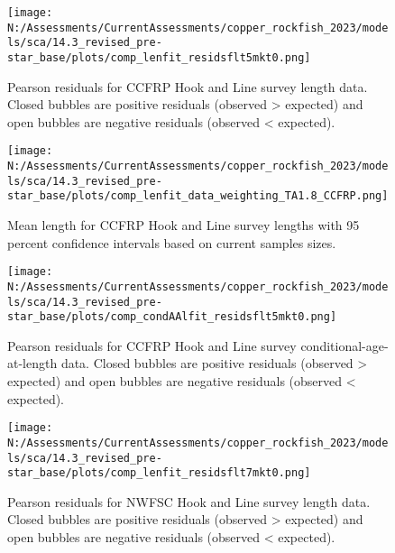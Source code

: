 \documentclass[11pt,
  english,
  letterpaper,
]{article}
\begin{document}
\pagebreak

\begin{figure}
\centering
\texttt{[image: N:/Assessments/CurrentAssessments/copper\_rockfish\_2023/models/sca/14.3\_revised\_pre-star\_base/plots/comp\_lenfit\_residsflt5mkt0.png]}
\caption{Pearson residuals for CCFRP Hook and Line survey length data. Closed bubbles are positive residuals (observed \textgreater{} expected) and open bubbles are negative residuals (observed \textless{} expected).\label{fig:ccfrp-len-pearson}}
\end{figure}

\pagebreak

\begin{figure}
\centering
\texttt{[image: N:/Assessments/CurrentAssessments/copper\_rockfish\_2023/models/sca/14.3\_revised\_pre-star\_base/plots/comp\_lenfit\_data\_weighting\_TA1.8\_CCFRP.png]}
\caption{Mean length for CCFRP Hook and Line survey lengths with 95 percent confidence intervals based on current samples sizes.\label{fig:ccfrp-mean-len-fit}}
\end{figure}

\pagebreak

\begin{figure}
\centering
\texttt{[image: N:/Assessments/CurrentAssessments/copper\_rockfish\_2023/models/sca/14.3\_revised\_pre-star\_base/plots/comp\_condAAlfit\_residsflt5mkt0.png]}
\caption{Pearson residuals for CCFRP Hook and Line survey conditional-age-at-length data. Closed bubbles are positive residuals (observed \textgreater{} expected) and open bubbles are negative residuals (observed \textless{} expected).\label{fig:ccfrp-age-pearson}}
\end{figure}

\pagebreak

\pagebreak

\pagebreak

\begin{figure}
\centering
\texttt{[image: N:/Assessments/CurrentAssessments/copper\_rockfish\_2023/models/sca/14.3\_revised\_pre-star\_base/plots/comp\_lenfit\_residsflt7mkt0.png]}
\caption{Pearson residuals for NWFSC Hook and Line survey length data. Closed bubbles are positive residuals (observed \textgreater{} expected) and open bubbles are negative residuals (observed \textless{} expected).\label{fig:nwfsc-hkl-pearson}}
\end{figure}
\end{document}
